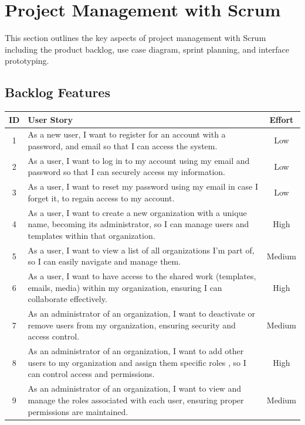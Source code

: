 \section{Project Management with Scrum}

This section outlines the key aspects of project management with Scrum including the product backlog, use case diagram, sprint planning, and interface prototyping.

\subsection{Backlog Features}
\begin{longtable}{|c|p{}|c|}
	\hline
	\textbf{ID} & \textbf{User Story} & \textbf{Effort} \\
	\hline
	\endhead
	1           & As a new user, I want to register for an account with a password, and email so that I can access the system. & Low \\
	\hline
	2           & As a user, I want to log in to my account using my email and password so that I can securely access my information. & Low \\
	\hline
	3           & As a user, I want to reset my password using my email in case I forget it, to regain access to my account. & Low \\
	\hline
	4           & As a user, I want to create a new organization with a unique name, becoming its administrator, so I can manage users and templates within that organization. & High \\
	\hline
	5           & As a user, I want to view a list of all organizations I'm part of, so I can easily navigate and manage them. & Medium \\
	\hline
	6           & As a user, I want to have access to the shared work (templates, emails, media) within my organization, ensuring I can collaborate effectively. & High \\
	\hline
	7           & As an administrator of an organization, I want to deactivate or remove users from my organization, ensuring security and access control. & Medium \\
	\hline
	8           & As an administrator of an organization, I want to add other users to my organization and assign them specific roles , so I can control access and permissions. & High \\
	\hline
	9           & As an administrator of an organization, I want to view and manage the roles associated with each user, ensuring proper permissions are maintained. & Medium \\

\end{longtable}
